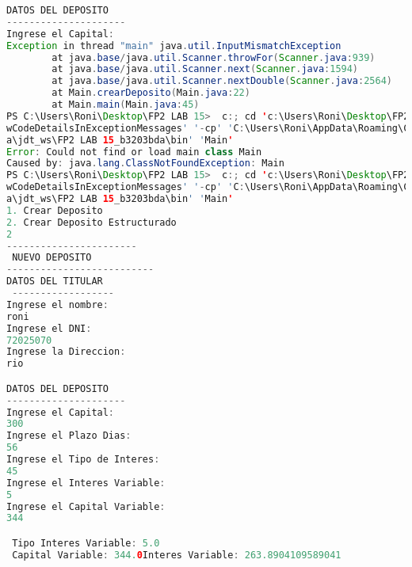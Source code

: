 \documentclass{article}
\begin{document}
\begin{itemize}
\begin{itemize}
\begin{lstlisting}[language=java]
DATOS DEL DEPOSITO
---------------------
Ingrese el Capital:
Exception in thread "main" java.util.InputMismatchException
        at java.base/java.util.Scanner.throwFor(Scanner.java:939)
        at java.base/java.util.Scanner.next(Scanner.java:1594)
        at java.base/java.util.Scanner.nextDouble(Scanner.java:2564)
        at Main.crearDeposito(Main.java:22)
        at Main.main(Main.java:45)
PS C:\Users\Roni\Desktop\FP2 LAB 15>  c:; cd 'c:\Users\Roni\Desktop\FP2 LAB 15'; & 'C:\Program Files\Java\jdk-16.0.1\bin\java.exe' '-XX:+Sho
wCodeDetailsInExceptionMessages' '-cp' 'C:\Users\Roni\AppData\Roaming\Code\User\workspaceStorage\b61e33d765771421b91829ee7ca87311\redhat.jav
a\jdt_ws\FP2 LAB 15_b3203bda\bin' 'Main'
Error: Could not find or load main class Main
Caused by: java.lang.ClassNotFoundException: Main
PS C:\Users\Roni\Desktop\FP2 LAB 15>  c:; cd 'c:\Users\Roni\Desktop\FP2 LAB 15'; & 'C:\Program Files\Java\jdk-16.0.1\bin\java.exe' '-XX:+Sho
wCodeDetailsInExceptionMessages' '-cp' 'C:\Users\Roni\AppData\Roaming\Code\User\workspaceStorage\b61e33d765771421b91829ee7ca87311\redhat.jav
a\jdt_ws\FP2 LAB 15_b3203bda\bin' 'Main'
1. Crear Deposito
2. Crear Deposito Estructurado
2
-----------------------
 NUEVO DEPOSITO
--------------------------
DATOS DEL TITULAR
 ------------------
Ingrese el nombre:
roni
Ingrese el DNI:
72025070
Ingrese la Direccion:
rio

DATOS DEL DEPOSITO
---------------------
Ingrese el Capital:
300
Ingrese el Plazo Dias:
56
Ingrese el Tipo de Interes:
45
Ingrese el Interes Variable:
5
Ingrese el Capital Variable:
344

 Tipo Interes Variable: 5.0
 Capital Variable: 344.0Interes Variable: 263.8904109589041
        \end{lstlisting}
	\end{itemize}
    

\end{itemize}
\end{document}
